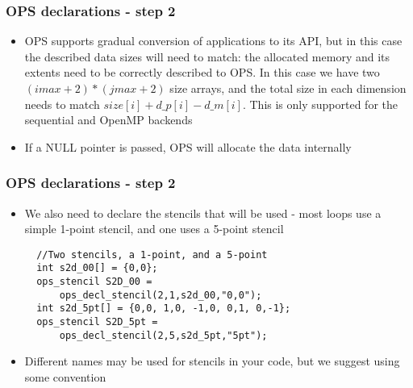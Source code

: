 \documentclass{beamer}
\begin{document}
\begin{frame}[fragile]
\frametitle{OPS declarations - step 2}
\begin{itemize}
  \item OPS supports gradual conversion of applications to its API, but in this case the described data sizes will need to match: the allocated memory and its extents need to be correctly described to OPS. In this case we have two $(imax+2)*(jmax+2)$ size arrays, and the total size in each dimension needs to match $size[i]+d\_p[i]-d\_m[i]$. This is only supported for the sequential and OpenMP backends
  \item If a NULL pointer is passed, OPS will allocate the data internally
\end{itemize}
\end{frame}

\begin{frame}[fragile]
\frametitle{OPS declarations - step 2}
\begin{itemize}
\item We also need to declare the stencils that will be used - most loops use a simple 1-point stencil, and one uses a 5-point stencil
\begin{lstlisting}
  //Two stencils, a 1-point, and a 5-point
  int s2d_00[] = {0,0};
  ops_stencil S2D_00 = 
      ops_decl_stencil(2,1,s2d_00,"0,0");
  int s2d_5pt[] = {0,0, 1,0, -1,0, 0,1, 0,-1};
  ops_stencil S2D_5pt = 
      ops_decl_stencil(2,5,s2d_5pt,"5pt");
  \end{lstlisting}
  \item Different names may be used for stencils in your code, but we suggest using some convention
\end{itemize}
\end{frame}
\end{document}
